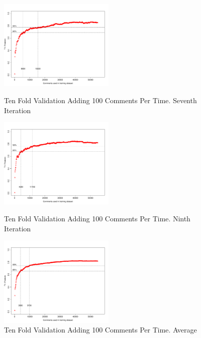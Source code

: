 \clearpage
\begin{figure}[thb!]
  \centering
  \vspace{-3mm}
  \includegraphics[width=0.49\textwidth]{figures/appendix/ten_fold_validation_design/ten_fold_validation_6_100.pdf}
  \vspace{-5mm}
  \caption{Ten Fold Validation Adding 100 Comments Per Time. Seventh Iteration}
  \label{fig:design_ten_fold_validation_6_100}
  \includegraphics[width=0.49\textwidth]{figures/appendix/ten_fold_validation_design/ten_fold_validation_8_100.pdf}
  \vspace{-5mm}
  \caption{Ten Fold Validation Adding 100 Comments Per Time. Ninth Iteration}
  \label{fig:design_ten_fold_validation_8_100}
  \includegraphics[width=0.49\textwidth]{figures/appendix/ten_fold_validation_design/ten_fold_validation_average_100.pdf}
  \vspace{-5mm}
  \caption{Ten Fold Validation Adding 100 Comments Per Time. Average}
  \label{fig:design_ten_fold_validation_average_100}
\end{figure}

